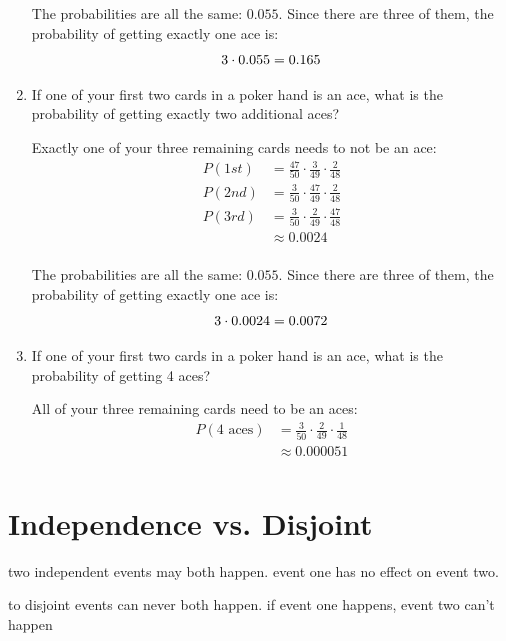 \documentclass[landscape]{exam}
\begin{document}
\begin{enumerate}
\begin{solution}
        The probabilities are all the same: $0.055$. Since there are three of
        them, the probability of getting exactly one ace is: 
        \[
          3 \cdot 0.055 = 0.165 \\
        \]
      \end{solution}

    \item If one of your first two cards in a poker hand is an ace, what is the
      probability of getting exactly two additional aces?

      \begin{solution}
        Exactly one of your three remaining cards needs to not be an ace:
        \begin{align*}
          P(1st) & = \frac{47}{50} \cdot \frac{3}{49} \cdot \frac{2}{48} \\
          P(2nd) & = \frac{3}{50} \cdot \frac{47}{49} \cdot \frac{2}{48} \\
          P(3rd) & = \frac{3}{50} \cdot \frac{2}{49} \cdot \frac{47}{48} \\
                 & \approx 0.0024 \\
        \end{align*}

        The probabilities are all the same: $0.055$. Since there are three of
        them, the probability of getting exactly one ace is: 
        \[
          3 \cdot 0.0024 = 0.0072 \\
        \]
      \end{solution}

    \item If one of your first two cards in a poker hand is an ace, what is the
      probability of getting 4 aces?

      \begin{solution}
        All of your three remaining cards need to be an aces:
        \begin{align*}
          P(\text{4 aces}) & = \frac{3}{50} \cdot \frac{2}{49} \cdot \frac{1}{48} \\
                           & \approx \boxed{ 0.000051 } \\
        \end{align*}
      \end{solution}
  \end{enumerate}

  \section{Independence vs. Disjoint}
  \begin{itemize*}
    \item two independent events may both happen. event one has no effect on
      event two.

    \item to disjoint events can never both happen. if event one happens, event
      two can't happen

  \end{itemize*}
\end{document}
